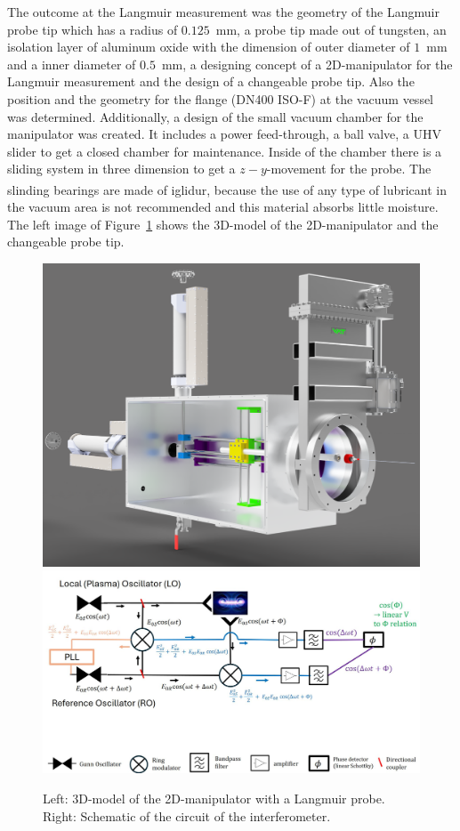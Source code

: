 The outcome at the Langmuir measurement was the geometry of the Langmuir probe tip which has a radius of $0.125$~mm, a probe tip made out of tungsten, an isolation layer of aluminum oxide with the dimension of outer diameter of $1$~mm and a inner diameter of $0.5$~mm, a designing concept of a  2D-manipulator for the Langmuir measurement and the design of a changeable probe tip. Also the position and the geometry for the flange (DN400 ISO-F) at the vacuum vessel was determined. Additionally, a design of the small vacuum chamber for the manipulator was created. It includes a power feed-through, a ball valve, a UHV slider to get a closed chamber for maintenance. Inside of the chamber there is a sliding system in three dimension to get a $z-y$-movement for the probe. The slinding bearings are made of iglidur\textsuperscript{\tiny\textregistered}, because the use of any type of lubricant in the vacuum area is not recommended and this material absorbs little moisture. The left image of Figure~\ref{fig:2D-manipulator and probe tip and interferometer_circuit_schematic} shows the 3D-model of the 2D-manipulator and the changeable probe tip.




\begin{figure}[h]
    \includegraphics[width=0.4\linewidth]{Images/04_Diagnostics/CAD_2D_manipulator.png}
    \includegraphics[width=0.59\linewidth]{Images/04_Diagnostics/interferometer_circuit_schematic.JPG}
    \caption{Left: 3D-model of the 2D-manipulator with a Langmuir probe.  Right: Schematic of the circuit of the interferometer.}
    \label{fig:2D-manipulator and probe tip and interferometer_circuit_schematic}
\end{figure}




